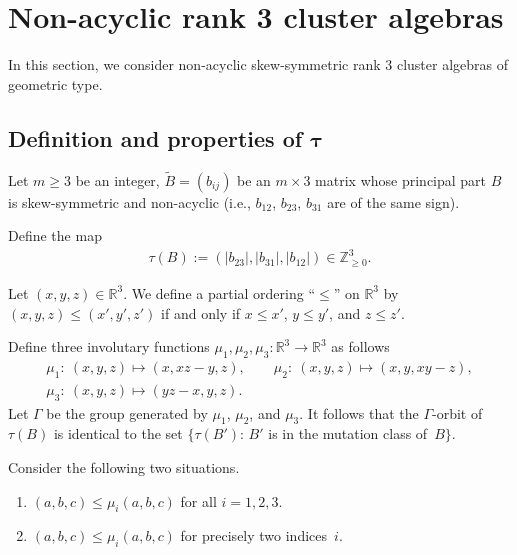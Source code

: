 \documentclass[11pt]{article}
\numberwithin{equation}{section}
\begin{document}
\setcounter{section}{3}
\setcounter{subsection}{0}
\setcounter{subsubsection}{0}
\setcounter{Theorem}{6}
\setcounter{equation}{2}
\section{Non-acyclic rank 3 cluster algebras}\label{section4}
In this section, we consider non-acyclic skew-symmetric rank 3 cluster algebras of geometric type.

\subsection[Def\/inition and properties of $\tau$]{Def\/inition and properties of $\boldsymbol{\tau}$}\label{section4.1}

Let  $m\geq 3$ be an integer, $\tilde{B}=(b_{ij})$ be an $m \times 3$ matrix whose principal part $B$ is skew-symmetric and non-acyclic (i.e., $b_{12}$, $b_{23}$, $b_{31}$ are of the same sign).

Def\/ine the map
\begin{gather*}
\tau(B):=(|b_{23}|,|b_{31}|,|b_{12}|)\in \mathbb{Z}^3_{\geq 0}.
\end{gather*}

\begin{Definition}
 Let $(x,y,z) \in \mathbb{R}^3$. We def\/ine a partial ordering ``$\le$'' on  $\mathbb{R}^3$ by $(x,y,z) \leq (x',y',z')$ if and only if $x \leq x'$, $y \leq y'$, and $z \leq z'$.
\end{Definition}

Def\/ine three involutary functions $\mu_1,\mu_2,\mu_3\colon \mathbb{R}^3\to\mathbb{R}^3$ as follows
\begin{gather*}
\mu_1\colon \ (x,y,z)\mapsto (x,xz-y,z), \qquad \mu_2\colon \ (x,y,z) \mapsto  (x,y,xy-z),
\\
\mu_3\colon \  (x,y,z) \mapsto(yz-x,y,z).
\end{gather*}
Let $\Gamma$ be the group generated by $\mu_1$, $\mu_2$, and $\mu_3$.  It follows that the $\Gamma$-orbit of $\tau(B)$ is identical to the set $\{\tau(B')$: $B'$ is in the mutation class of~$B \}$.

 Consider the following two situations.
\begin{enumerate}\itemsep=0pt
\item[(M1)] $(a,b,c)\leq \mu_i(a,b,c)$ for all $i=1,2,3$.
\item[(M2)] $(a,b,c)\leq \mu_i(a,b,c)$ for precisely two indices~$i$.
\end{enumerate}
\end{document}
